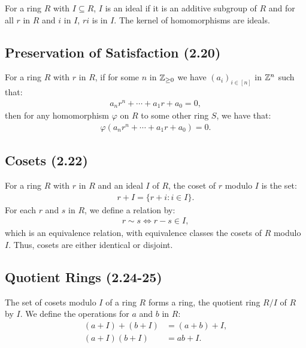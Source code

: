 For a ring $R$ with $I \subseteq R$, $I$ is an ideal if it is an additive
subgroup of $R$ and for all $r$ in $R$ and $i$ in $I$, $ri$ is in $I$.
The kernel of homomorphisms are ideals.

\subsection{Preservation of Satisfaction (2.20)} \label{2.20}

For a ring $R$ with $r$ in $R$, if for some $n$ in $\mathbb{Z}_{\geq 0}$ we have 
$(a_i)_{i \in [n]}$ in $\mathbb{Z}^n$ such that: \begin{align*}
    a_nr^n + \cdots + a_1r + a_0 = 0,
\end{align*} then for any homomorphism $\varphi$ on $R$ to some other ring $S$,
we have that: \begin{align*}
    \varphi(a_nr^n + \cdots + a_1r + a_0) = 0.
\end{align*}

\subsection{Cosets (2.22)} \label{2.22}

For a ring $R$ with $r$ in $R$ and an ideal $I$ of $R$, the coset of $r$ modulo $I$ is
the set: \begin{align*}
    r + I = \{r + i : i \in I\}.
\end{align*} For each $r$ and $s$ in $R$, we define a relation by: \begin{align*}
    r \sim s \Longleftrightarrow r - s \in I,
\end{align*} which is an equivalence relation, with equivalence classes the cosets of
$R$ modulo $I$. Thus, cosets are either identical or disjoint.

\subsection{Quotient Rings (2.24-25)} \label{2.24} \label{2.25}

The set of cosets modulo $I$ of a ring $R$ forms a ring, the quotient ring $R / I$ of 
$R$ by $I$. We define the operations for $a$ and $b$ in $R$: \begin{align*}
    (a + I) + (b + I) &= (a + b) + I, \\
    (a + I)(b + I) &= ab + I.
\end{align*}
